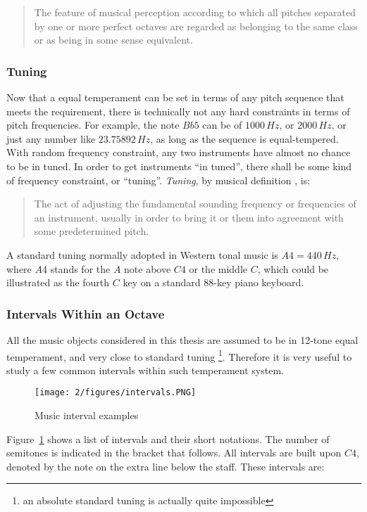 \begin{quote}
The feature of musical perception according to which all pitches separated by one or more perfect octaves are regarded as belonging to the same class or as being in some sense equivalent.
\end{quote}

\subsubsection{Tuning}
Now that a equal temperament can be set in terms of any pitch sequence that meets the requirement, there is technically not any hard constraints in terms of pitch frequencies. For example, the note $Bb5$ can be of $1000\,Hz$, or $2000\,Hz$, or just any number like $23.75892\,Hz$, as long as the sequence is equal-tempered. With random frequency constraint, any two instruments have almost no chance to be in tuned. In order to get instruments ``in tuned'', there shall be some kind of frequency constraint, or ``tuning''. {\it Tuning}, by musical definition \cite{randel1999harvard}, is:

\begin{quote}
The act of adjusting the fundamental sounding frequency or frequencies of an instrument, usually in order to bring it or them into agreement with some predetermined pitch.
\end{quote}

A standard tuning normally adopted in Western tonal music is $A4 = 440\,Hz$, where $A4$ stands for the $A$ note above $C4$ or the middle $C$, which could be illustrated as the fourth $C$ key on a standard 88-key piano keyboard.

\subsubsection{Intervals Within an Octave}
All the music objects considered in this thesis are assumed to be in 12-tone equal temperament, and very close to standard tuning \footnote{an absolute standard tuning is actually quite impossible}. Therefore it is very useful to study a few common intervals within such temperament system.

\begin{figure}[htb]
\centering
\texttt{[image: 2/figures/intervals.PNG]}
\caption{Music interval examples}
\label{fig:2-mi}
\end{figure}

Figure~\ref{fig:2-mi} shows a list of intervals and their short notations. The number of semitones is indicated in the bracket that follows. All intervals are built upon $C4$, denoted by the note on the extra line below the staff. These intervals are:

